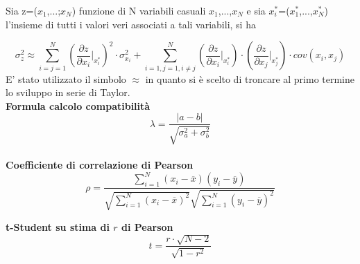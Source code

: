 \documentclass[a4paper,11pt,oneside]{article}
\begin{document}
Sia z=($x_1$,...;$x_N$) funzione di N variabili casuali $x_1$,...,$x_N$ e sia ${x_i^\ast}$=($x_1^\ast$,...,$x_N^{\ast}$) l'insieme di tutti i valori veri associati a tali variabili, si ha 

\begin{equation*}
    \sigma_z^{2}\approx  \sum_{i=j=1}^{N}\left ( \frac{\partial z}{\partial x_i}\Big|_{x_i^{\ast}} \right )^{2}\cdot\sigma_{x_i}^{2} +\sum_{i=1,j=1,i\neq j}^{N}\left (\frac{\partial z }{\partial x_i}\Big|_{x_i^{\ast}} \right ) \cdot \left ( \frac{\partial z}{\partial x_j} \Big|_{x_j^{\ast}} \right )\cdot cov(x_i,x_j)\label{eq:prop_errori}
\end{equation*}
E' stato utilizzato il simbolo $\approx$ in quanto si è scelto di troncare al primo termine lo sviluppo in serie di Taylor.\\


\textbf{Formula calcolo compatibilità}\\
\begin{equation*}
    \lambda=\frac{\left|a-b\right|}{\sqrt{\sigma^{2}_{a}+\sigma^{2}_{b}}}
\end{equation*}\\
\textbf{Coefficiente di correlazione di Pearson}\\
\begin{equation*}
    \rho=  \frac{\sum_{i=1}^{N}(x_i - \overline{x}
    )(y_i - \overline{y})}{\sqrt{\sum_{i=1}^{N}(x_i -\overline{x})^2}\sqrt{\sum_{i=1}^{N}(y_i - \overline{y})^2}}
\end{equation*}

\textbf{t-Student su stima di $r$ di Pearson}\\
\begin{equation*}
    t=\frac{r \cdot \sqrt{N-2} }{\sqrt{1- r^2}}
\end{equation*}
\end{document}
